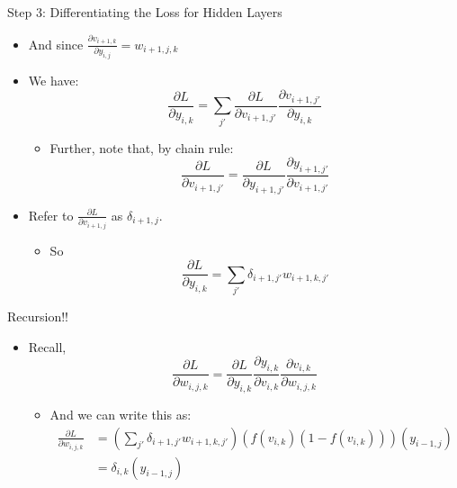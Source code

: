 \documentclass[aspectratio=169]{beamer}
\begin{document}
\begin{frame}{Step 3: Differentiating the Loss for Hidden Layers}
\begin{itemize}
	\item And since $\frac{\partial  v_{i+1,k}}{\partial y_{i,j}} = w_{i+1,j,k}$ 
	\item We have:
		$$\frac{\partial L}{\partial y_{i,k}} = \sum_{j'} \frac{\partial L}{\partial v_{i+1,j'}}
			\frac{\partial  v_{i+1,j'}}{\partial y_{i,k}}$$
	\begin{itemize}
	\item Further, note that, by chain rule:
		 $$\frac{\partial L}{\partial v_{i+1,j'}} = \frac{\partial L}{\partial y_{i+1,j'}} 
                                                \frac{\partial y_{i+1,j'}}{\partial v_{i+1,j'}}$$
	\end{itemize}
	\item Refer to $\frac{\partial L}{\partial v_{i+1,j}}$ as $\delta_{i+1,j}$.
	\begin{itemize}
	\item So
		$$\frac{\partial L}{\partial y_{i,k}} = \sum_{j'} \delta_{i+1,j'}
                        w_{i+1,k,j'}$$
	\end{itemize}
\end{itemize}
\end{frame}
\begin{frame}{Recursion!!}
\begin{itemize}
	\item Recall, 
	$$ \frac{\partial L}{\partial w_{i,j,k}} = \frac{\partial L}{\partial y_{i,k}} 
						\frac{\partial y_{i,k}}{\partial v_{i,k}}
						\frac{\partial v_{i,k}}{\partial w_{i,j,k}}$$
	\begin{itemize}
	\item And we can write this as:
	\begin{align} \frac{\partial L}{\partial w_{i,j,k}} &= 
		\left( \sum_{j'} \delta_{i+1,j'} w_{i+1,k,j'} \right)  
		\left( f(v_{i,k})(1 - f(v_{i,k})) \right)
			\left( y_{i-1,j} \right) \nonumber \\	
		&= \delta_{i,k} \left( y_{i-1,j} \right) \nonumber \end{align}
	\end{itemize}
\end{itemize}
\end{frame}
\end{document}
